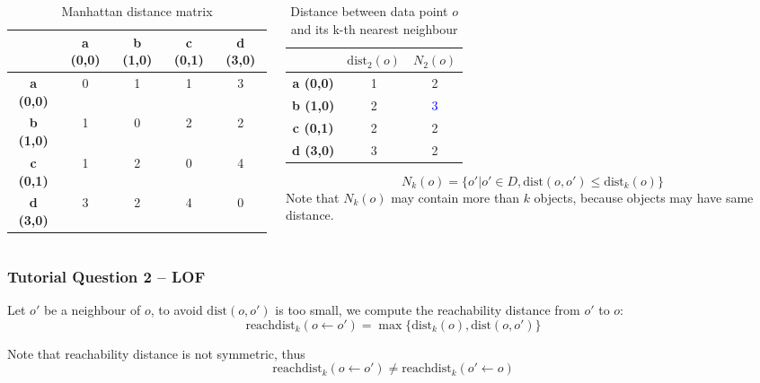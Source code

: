 \documentclass[aspectratio=169, 10pt]{beamer}
\begin{document}
\begin{frame}
\begin{columns}[t]
\begin{column}{0.5\textwidth}
            \begin{table}[]
                \scriptsize
                \begin{tabular}{c|cccc}
                             & \textbf{a (0,0)} & \textbf{b (1,0)} & \textbf{c (0,1)} & \textbf{d (3,0)} \\ \hline
                \textbf{a (0,0)} & 0            & 1            & 1            & 3            \\
                \textbf{b (1,0)} & 1            & 0            & 2            & 2            \\
                \textbf{c (0,1)} & 1            & 2            & 0            & 4            \\
                \textbf{d (3,0)} & 3            & 2            & 4            & 0           
                \end{tabular}
                \caption{Manhattan distance matrix}
            \end{table}
        \end{column}
        \begin{column}{0.5\textwidth}
            \begin{table}[]
                \scriptsize
                \begin{tabular}{c|cc}
                             & $\text{dist}_2(o)$ & $N_2(o)$ \\ \hline
                \textbf{a (0,0)} & 1 & 2 \\
                \textbf{b (1,0)} & 2 & \textcolor{blue}{3} \\
                \textbf{c (0,1)} & 2 & 2 \\
                \textbf{d (3,0)} & 3 & 2  
                \end{tabular}
                \caption{Distance between data point $o$ and its k-th nearest neighbour}
            \end{table}
            \[
                N_k(o) = \{o' | o' \in D, \text{dist}(o, o') \le \text{dist}_k(o)\}
            \]
            Note that $N_k(o)$ may contain more than $k$ objects, because objects may have same distance.
        \end{column}
    \end{columns}

\end{frame}

\begin{frame}
    \frametitle{Tutorial Question 2 -- LOF}

    Let $o'$ be a neighbour of $o$, to avoid $\text{dist}(o, o')$ is too small, we compute the reachability distance from $o'$ to $o$:
    \[
        \text{reachdist}_k(o \leftarrow o') = \max\{\text{dist}_k(o), \text{dist}(o, o')\}
    \]
    
    Note that reachability distance is not symmetric, thus 
    \[
        \text{reachdist}_k(o \leftarrow o') \neq \text{reachdist}_k(o' \leftarrow o)
    \]

\end{frame}
\end{document}

